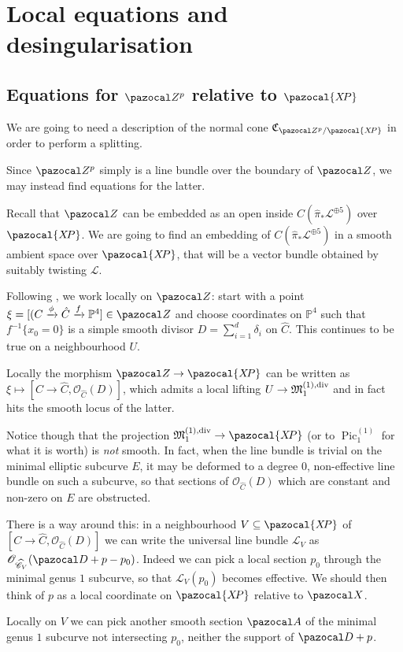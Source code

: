 \documentclass[11pt]{amsart}
\newcommand{\PP}{\mathbb P}
\newcommand{\OO}{\mathcal O}
\renewcommand{\to}{\rightarrow}
\newcommand{\A}{\pazocal A}
\newcommand{\X}{\pazocal X}
\newcommand{\XP}{\pazocal{X\!P}}
\newcommand{\hC}{\widehat{\mathcal C}}
\newcommand{\Z}{\pazocal Z}
\newcommand{\MM}{\mathfrak M}
\newcommand{\Pic}{\operatorname{Pic}}
\theoremstyle{plain}
\theoremstyle{definition}
\begin{document}
\section{Local equations and desingularisation}\label{sec:equations}
\subsection{Equations for $\Z^p$ relative to $\XP$}
We are going to need a description of the normal cone $\mathfrak C_{\Z^p/\XP}$ in order to perform a splitting.

Since $\Z^p$ simply is a line bundle over the boundary of $\Z$, we may instead find equations for the latter.

Recall that $\Z$ can be embedded as an open inside $C(\hat{\pi}_*\mathcal L^{\oplus 5})$ over $\XP$. We are going to find an embedding of $C(\hat{\pi}_*\mathcal L^{\oplus 5})$ in a smooth ambient space over $\XP$, that will be a vector bundle obtained by suitably twisting $\mathcal L$.

Following \cite{HL}, we work locally on $\Z$: start with a point $\xi=[(C\xrightarrow{\phi}\hat C\xrightarrow{f}\PP^4]\in\Z$ and choose coordinates on $\PP^4$ such that $f^{-1}\{x_0=0\}$ is a simple smooth divisor $D=\sum_{i=1}^d\delta_i$ on $\hat C$. This continues to be true on a neighbourhood $U$.

 Locally the morphism $\Z\to\XP$ can be written as $\xi\mapsto[C\to\hat C,\OO_{\hat C}(D)]$, which admits a local lifting $U\to\MM_1^{(1),\rm{div}}$ and in fact hits the smooth locus of the latter.
 
  Notice though that the projection $\MM_1^{(1),\rm{div}}\to \XP$ (or to $\Pic_1^{(1)}$ for what it is worth) is \emph{not} smooth. In fact, when the line bundle is trivial on the minimal elliptic subcurve $E$, it may be deformed to a degree $0$, non-effective line bundle on such a subcurve, so that sections of $\OO_{\hat C}(D)$ which are constant and non-zero on $E$ are obstructed.

There is a way around this: in a neighbourhood $V\subseteq \XP$ of $[C\to\hat C,\OO_{\hat C}(D)]$ we can write the universal line bundle $\mathcal L_V$ as $\OO_{\hC_V}(\pazocal D + p-p_0)$. Indeed we can pick a local section $p_0$ through the minimal genus $1$ subcurve, so that $\mathcal L_V(p_0)$ becomes effective. We should then think of $p$ as a local coordinate on $\XP$ relative to $\X$.

Locally on $V$ we can pick another smooth section $\A$ of the minimal genus $1$ subcurve not intersecting $p_0$, neither the support of $\pazocal D+p$.
\end{document}
